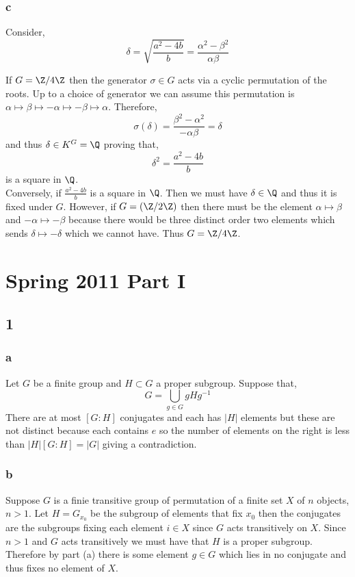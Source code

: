 \documentclass[12pt]{article}
\begin{document}
\subsubsection{c}

Consider,
\[ \delta = \sqrt{\frac{a^2 - 4 b}{b}} = \frac{\alpha^2 - \beta^2}{\alpha \beta} \]

If $G = \Z / 4 \Z$ then the generator $\sigma \in G$ acts via a cyclic permutation of the roots. Up to a choice of generator we can assume this permutation is $\alpha \mapsto \beta \mapsto -\alpha \mapsto - \beta \mapsto \alpha$. Therefore,
\[ \sigma(\delta) = \frac{\beta^2 - \alpha^2}{-\alpha \beta} = \delta \]
and thus $\delta \in K^G = \Q$ proving that,
\[ \delta^2 = \frac{a^2 - 4b}{b} \]
is a square in $\Q$.
\bigskip\\
Conversely, if $\frac{a^2 - 4b}{b}$ is a square in $\Q$. Then we must have $\delta \in \Q$ and thus it is fixed under $G$. However, if $G = (\Z / 2 \Z)$ then there must be the element $\alpha \mapsto \beta$ and $-\alpha \mapsto - \beta$ because there would be three distinct order two elements which sends $\delta \mapsto - \delta$ which we cannot have. Thus $G = \Z / 4 \Z$. 

\section{Spring 2011 Part I}

\subsection{1}

\subsubsection{a}

Let $G$ be a finite group and $H \subset G$ a proper subgroup. Suppose that,
\[ G = \bigcup_{g \in G} g H g^{-1} \]
There are at most $[G : H]$ conjugates and each has $|H|$ elements but these are not distinct because each contains $e$ so the number of elements on the right is less than $|H| [G : H] = |G|$ giving a contradiction.

\subsubsection{b}

Suppose $G$ is a finie transitive group of permutation of a finite set $X$ of $n$ objects, $n > 1$. Let $H = G_{x_0}$ be the subgroup of elements that fix $x_0$ then the conjugates are the subgroups fixing each element $i \in X$ since $G$ acts transitively on $X$. Since $n > 1$ and $G$ acts transitively we must have that $H$ is a proper subgroup. Therefore by part (a) there is some element $g \in G$ which lies in no conjugate and thus fixes no element of $X$. 
\end{document}
